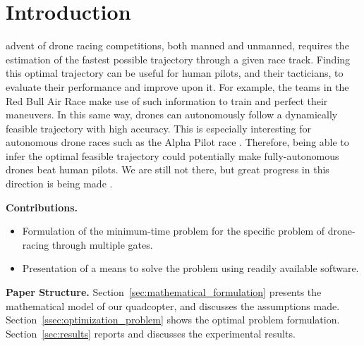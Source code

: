 
\section{Introduction}
\label{sec:introduction}

  advent of drone racing competitions, both manned and unmanned, requires the estimation of the fastest possible trajectory through a given race track.
 Finding this optimal trajectory can be useful for human pilots, and their tacticians, to evaluate their performance and improve upon it.
 For example, the teams in the Red Bull Air Race \cite{redbull} make use of such information to train and perfect their maneuvers.
 In this same way, drones can autonomously follow a dynamically feasible trajectory with high accuracy.
 This is especially interesting for autonomous drone races such as the Alpha Pilot race \cite{AlphaPilot}.
 Therefore, being able to infer the optimal feasible trajectory could potentially make fully-autonomous drones beat human pilots.
 We are still not there, but great progress in this direction is being made \cite{delmerico2019we}.

{\bf Contributions.}
\begin{itemize}
  \item Formulation of the minimum-time problem for the specific problem of drone-racing through multiple gates.
  \item Presentation of a means to solve the problem using readily available software.
\end{itemize}

{\bf Paper Structure.}
Section~\ref{sec:mathematical_formulation} presents the mathematical model of our quadcopter, and discusses the assumptions made.
Section~\ref{ssec:optimization_problem} shows the optimal problem formulation.
Section~\ref{sec:results} reports and discusses the experimental results.
